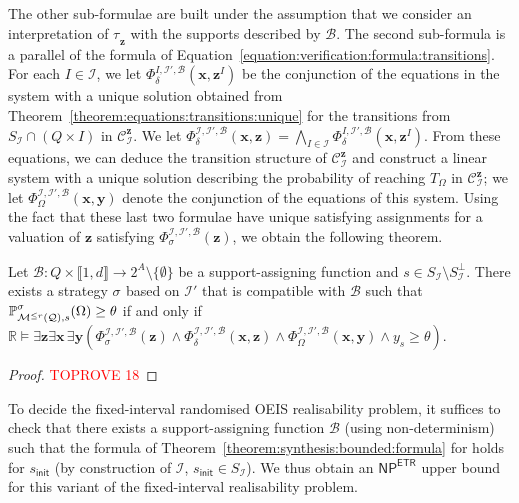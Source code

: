 \documentclass[a4paper,UKenglish,cleveref,autoref,thm-restate,colorlinks]{lipics-v2021}
\newcommand{\init}{\mathsf{init}}
\newcommand{\integerInterval}[1]{\llbracket{}#1\rrbracket{}}
\newcommand{\np}{\textsf{NP}}
\newcommand{\etr}{\textsf{ETR}}
\newcommand{\IR}{\mathbb{R}}
\newcommand{\subsets}[1]{2^{#1}}
\newcommand{\mdp}{\mathcal{M}}
\newcommand{\mdpStateSpace}{S}
\newcommand{\ocmdp}{\mathcal{Q}}
\newcommand{\ocmdpFin}[2]{\mdp^{\leq #2}(#1)}
\newcommand{\ocStateSpace}{Q}
\newcommand{\ocConfig}{s}
\newcommand{\ocActionSpace}{A}
\newcommand{\ocTrans}{\delta}
\newcommand{\counterUB}{r}
\newcommand{\mchain}{\mathcal{C}}
\newcommand{\intPart}{\mathcal{I}}
\newcommand{\interval}{I}
\newcommand{\intNum}{d}
\newcommand{\compressChainStrat}[1]{\mchain^{#1}_{\intPart}}
\newcommand{\compressChainStateSpace}{\mdpStateSpace_{\intPart}}
\newcommand{\compressChainStateSpaceStar}{\mdpStateSpace_{\intPart}^{\bot}}
\newcommand{\varTrans}{x}
\newcommand{\varTransTuple}{\mathbf{\varTrans}}
\newcommand{\varObj}{y}
\newcommand{\varObjTuple}{\mathbf{\varObj}}
\newcommand{\varStrat}{z}
\newcommand{\varStratI}{\mathbf{\varStrat}^{\interval}}
\newcommand{\varStratTuple}{\mathbf{\varStrat}}
\newcommand{\compressChainSymbolic}{\compressChainStrat{\varStratTuple}}
\newcommand{\formulaTransBase}{\Phi_{\ocTrans}}
\newcommand{\formulaObjBase}{\Phi_{\objective}}
\newcommand{\formulaStratBase}{\Phi_{\strat}}
\newcommand{\suppBounded}{\mathcal{B}}
\newcommand{\formulaStratB}{\formulaStratBase^{\intPart,\intPart',\suppBounded}}
\newcommand{\formulaTransB}{\formulaTransBase^{\intPart,\intPart',\suppBounded}}
\newcommand{\formulaTransBI}{\formulaTransBase^{\interval,\intPart', \suppBounded}}
\newcommand{\formulaObjB}{\formulaObjBase^{\intPart,\intPart',\suppBounded}}
\newcommand{\objective}{\Omega}
\newcommand{\target}{T}
\newcommand{\thresProba}{\theta}
\newcommand{\stratGeneric}[1]{{\sigma_{#1}}}
\newcommand{\strat}{\stratGeneric{}}
\newcommand{\stratBGeneric}[1]{{\tau_{#1}}}
\newcommand{\stratB}{\stratBGeneric{}}
\begin{document}
The other sub-formulae are built under the assumption that we consider an interpretation of $\stratB_{\varStratTuple}$ with the supports described by $\suppBounded$.
The second sub-formula is a parallel of the formula of Equation~\eqref{equation:verification:formula:transitions}.
For each $\interval\in\intPart$, we let $\formulaTransBI(\varTransTuple, \varStratI)$ be the conjunction of the equations in the system with a unique solution obtained from Theorem~\ref{theorem:equations:transitions:unique} for the transitions from $\compressChainStateSpace\cap(\ocStateSpace\times\interval)$ in $\compressChainSymbolic$.
We let $\formulaTransB(\varTransTuple, \varStratTuple) = \bigwedge_{\interval\in\intPart}\formulaTransBI(\varTransTuple, \varStratI)$.
From these equations, we can deduce the transition structure of $\compressChainSymbolic$ and construct a linear system with a unique solution describing the probability of reaching $\target_\objective$ in $\compressChainSymbolic$; we let $\formulaObjB(\varTransTuple, \varObjTuple)$ denote the conjunction of the equations of this system.
Using the fact that these last two formulae have unique satisfying assignments for a valuation of $\varStratTuple$ satisfying $\formulaStratB(\varStratTuple)$, we obtain the following theorem.
\begin{theorem}\label{theorem:synthesis:bounded:formula}
  Let $\suppBounded\colon\ocStateSpace\times\integerInterval{1, \intNum}\to\subsets{\ocActionSpace}\setminus\{\emptyset\}$ be a support-assigning function and $\ocConfig\in\compressChainStateSpace\setminus\compressChainStateSpaceStar$.
  There exists a strategy $\strat$ based on $\intPart'$ that is compatible with $\suppBounded$ such that $\probaGverb{\ocmdpFin{\ocmdp}{\counterUB}}{\ocConfig}{\strat}(\objective) \geq\thresProba$ if and only if $\IR\models\exists\varStratTuple\exists\varTransTuple\,\exists\varObjTuple (\formulaStratB(\varStratTuple)\land\formulaTransB(\varTransTuple,\varStratTuple)\land\formulaObjB(\varTransTuple, \varObjTuple)\land \varObj_\ocConfig\geq\thresProba)$.
\end{theorem}
\begin{proof}\textcolor{red}{TOPROVE 18}\end{proof}

To decide the fixed-interval randomised OEIS realisability problem, it suffices to check that there exists a support-assigning function $\suppBounded$ (using non-determinism) such that the formula of Theorem~\ref{theorem:synthesis:bounded:formula} for holds for $\ocConfig_\init$ (by construction of $\intPart$, $\ocConfig_\init\in\compressChainStateSpace$).
We thus obtain an $\np^\etr$ upper bound for this variant of the fixed-interval realisability problem.
\end{document}

